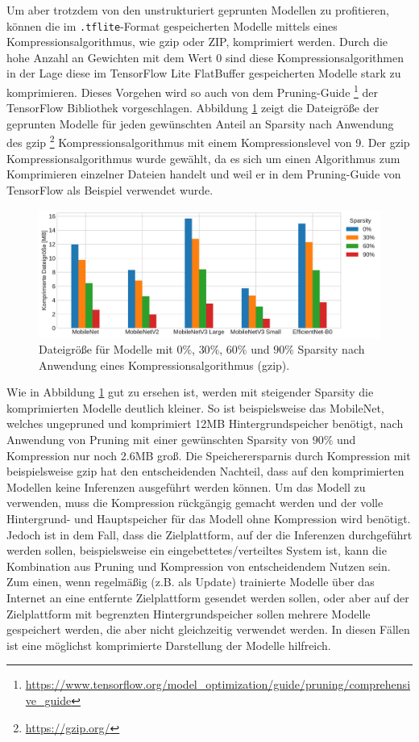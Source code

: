 Um aber trotzdem von den unstrukturiert geprunten Modellen zu profitieren, können die im \lstinline{.tflite}-Format gespeicherten Modelle mittels eines Kompressionsalgorithmus, wie gzip oder ZIP, komprimiert werden. Durch die hohe Anzahl an Gewichten mit dem Wert 0 sind diese Kompressionsalgorithmen in der Lage diese im TensorFlow Lite FlatBuffer gespeicherten Modelle stark zu komprimieren. Dieses Vorgehen wird so auch von dem Pruning-Guide \footnote{\url{https://www.tensorflow.org/model_optimization/guide/pruning/comprehensive_guide}} der TensorFlow Bibliothek vorgeschlagen. Abbildung \ref{f4.3} zeigt die Dateigröße der geprunten Modelle für jeden gewünschten Anteil an Sparsity nach Anwendung des gzip \footnote{\url{https://gzip.org/}} Kompressionsalgorithmus mit einem Kompressionslevel von 9. Der gzip Kompressionsalgorithmus wurde gewählt, da es sich um einen Algorithmus zum Komprimieren einzelner Dateien handelt und weil er in dem Pruning-Guide von TensorFlow als Beispiel verwendet wurde.

\begin{figure}[htbp]
\centerline{\includegraphics[width=\textwidth]{content/images/pruned_and_compressed.pdf}}
\caption{Dateigröße für Modelle mit $0\%$, $30\%$, $60\%$ und $90\%$ Sparsity nach Anwendung eines Kompressionsalgorithmus (gzip).}
\label{f4.3}
\end{figure}

Wie in Abbildung \ref{f4.3} gut zu ersehen ist, werden mit steigender Sparsity die komprimierten Modelle deutlich kleiner. So ist beispielsweise das MobileNet, welches ungepruned und komprimiert 12MB Hintergrundspeicher benötigt, nach Anwendung von Pruning mit einer gewünschten Sparsity von $90\%$ und Kompression nur noch 2.6MB groß. Die Speicherersparnis durch Kompression mit beispielsweise gzip hat den entscheidenden Nachteil, dass auf den komprimierten Modellen keine Inferenzen ausgeführt werden können. Um das Modell zu verwenden, muss die Kompression rückgängig gemacht werden und der volle Hintergrund- und Hauptspeicher für das Modell ohne Kompression wird benötigt. Jedoch ist in dem Fall, dass die Zielplattform, auf der die Inferenzen durchgeführt werden sollen, beispielsweise ein eingebettetes/verteiltes System ist, kann die Kombination aus Pruning und Kompression von entscheidendem Nutzen sein. Zum einen, wenn regelmäßig (z.B. als Update) trainierte Modelle über das Internet an eine entfernte Zielplattform gesendet werden sollen, oder aber auf der Zielplattform mit begrenzten Hintergrundspeicher sollen mehrere Modelle gespeichert werden, die aber nicht gleichzeitig verwendet werden. In diesen Fällen ist eine möglichst komprimierte Darstellung der Modelle hilfreich.


